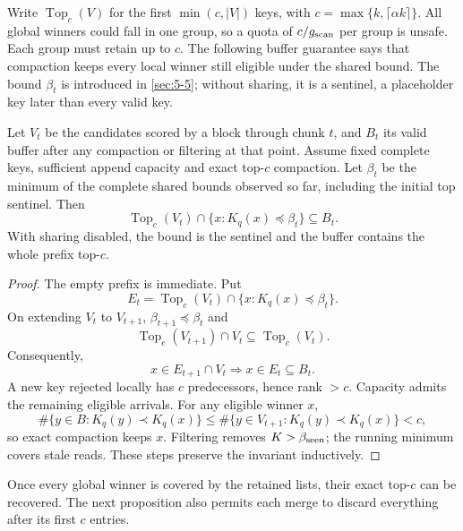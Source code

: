 Write $\operatorname{Top}_c(V)$ for the first $\min(c,|V|)$ keys, with
$c=\max\{k,\lceil\alpha k\rceil\}$. All global winners could fall in
one group, so a quota of $c/g_{\mathrm{scan}}$ per group is unsafe. Each group must
retain up to $c$. The following buffer guarantee says that compaction
keeps every local winner still eligible under the shared bound.
The bound $\beta_t$ is introduced in \cref{sec:5-5}; without sharing,
it is a sentinel, a placeholder key later than every valid key.

\begin{resultblock}
\begin{lemma}
\label{lem:5-buffer}
Let $V_t$ be the candidates scored by a block through chunk $t$, and
$B_t$ its valid buffer after any compaction or filtering at that point.
Assume fixed complete keys, sufficient append capacity and exact
top-$c$ compaction. Let $\beta_t$ be the minimum of the complete shared
bounds observed so far, including the initial top sentinel. Then
\begin{equation}
 \operatorname{Top}_c(V_t)\cap\{x:K_q(x)\preceq\beta_t\}
 \subseteq B_t.
 \label{eq:5-buffer-invariant}
\end{equation}
With sharing disabled, the bound is the sentinel and the buffer contains
the whole prefix top-$c$.
\end{lemma}
\begin{proof}
The empty prefix is immediate. Put
\[
 E_t=\operatorname{Top}_c(V_t)\cap\{x:K_q(x)\preceq\beta_t\}.
\]
On extending $V_t$ to $V_{t+1}$, $\beta_{t+1}\preceq\beta_t$ and
\[
 \operatorname{Top}_c(V_{t+1})\cap V_t\subseteq\operatorname{Top}_c(V_t).
\]
Consequently,
\[
 x\in E_{t+1}\cap V_t\Rightarrow x\in E_t\subseteq B_t.
\]
A new key rejected locally has $c$ predecessors, hence rank $>c$. Capacity admits the remaining eligible arrivals. For any eligible winner $x$,
\[
 \#\{y\in B:K_q(y)\prec K_q(x)\}
 \leq\#\{y\in V_{t+1}:K_q(y)\prec K_q(x)\}<c,
\]
so exact compaction keeps $x$. Filtering removes $K>\beta_{\rm seen}$; the running minimum covers stale reads. These steps preserve the invariant inductively.
\end{proof}
\end{resultblock}
Once every global winner is covered by the retained lists, their exact
top-$c$ can be recovered. The next proposition also permits each merge
to discard everything after its first $c$ entries.

